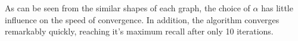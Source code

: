 \documentclass[11pt]{article}
\begin{document}
As can be seen from the similar shapes of each graph, the choice of $\alpha$ has
little influence on the speed of convergence. In addition, the algorithm
converges remarkably quickly, reaching it's maximum recall after only 10
iterations.
\begin{figure}[h!]
  \centering



\end{figure}
\end{document}
